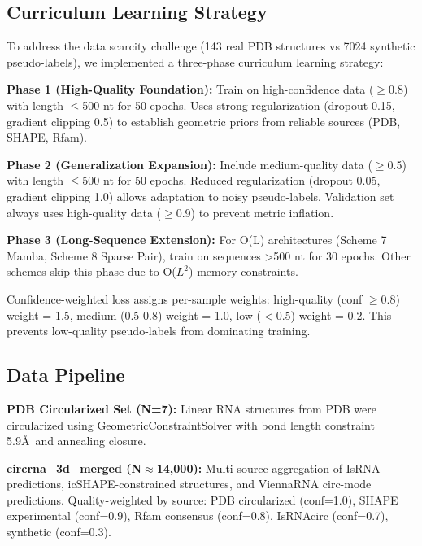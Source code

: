\subsection{Curriculum Learning Strategy}

To address the data scarcity challenge (143 real PDB structures vs 7024 synthetic pseudo-labels), we implemented a three-phase curriculum learning strategy:

\textbf{Phase 1 (High-Quality Foundation):} Train on high-confidence data ($\geq$0.8) with length $\leq$500 nt for 50 epochs. Uses strong regularization (dropout 0.15, gradient clipping 0.5) to establish geometric priors from reliable sources (PDB, SHAPE, Rfam).

\textbf{Phase 2 (Generalization Expansion):} Include medium-quality data ($\geq$0.5) with length $\leq$500 nt for 50 epochs. Reduced regularization (dropout 0.05, gradient clipping 1.0) allows adaptation to noisy pseudo-labels. Validation set always uses high-quality data ($\geq$0.9) to prevent metric inflation.

\textbf{Phase 3 (Long-Sequence Extension):} For O(L) architectures (Scheme 7 Mamba, Scheme 8 Sparse Pair), train on sequences >500 nt for 30 epochs. Other schemes skip this phase due to O($L^2$) memory constraints.

Confidence-weighted loss assigns per-sample weights: high-quality (conf $\geq$0.8) weight = 1.5, medium (0.5-0.8) weight = 1.0, low ($<$0.5) weight = 0.2. This prevents low-quality pseudo-labels from dominating training.

\subsection{Data Pipeline}

\textbf{PDB Circularized Set (N=7):} Linear RNA structures from PDB were circularized using GeometricConstraintSolver with bond length constraint 5.9\AA\ and annealing closure.

\textbf{circrna\_3d\_merged (N$\approx$14,000):} Multi-source aggregation of IsRNA predictions, icSHAPE-constrained structures, and ViennaRNA circ-mode predictions. Quality-weighted by source: PDB circularized (conf=1.0), SHAPE experimental (conf=0.9), Rfam consensus (conf=0.8), IsRNAcirc (conf=0.7), synthetic (conf=0.3).

